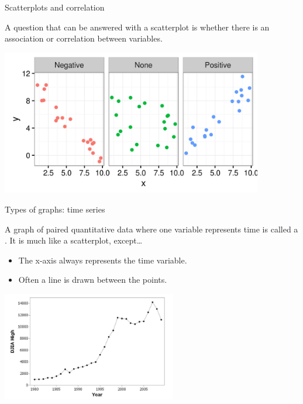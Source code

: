\documentclass{beamer}
\begin{document}
\begin{frame}{Scatterplots and correlation}
\begin{block}{}
\large
A question that can be answered with a scatterplot is whether there is an association or correlation between variables.  
\end{block}
\includegraphics[width=4.5in]{../images/ch02_scatter_cor}
\end{frame}

\begin{frame}{Types of graphs: time series}
\begin{block}{}
A graph of paired quantitative data where one variable represents time is called a . It is much like a scatterplot, except\ldots
\begin{itemize}
\item The x-axis always represents the time variable.
\item Often a line is drawn between the points.
\end{itemize}
\end{block}
\bigskip
{\centering
\includegraphics[width=3in]{../images/ch02_timeseries}
\par}

\end{frame}
\end{document}
